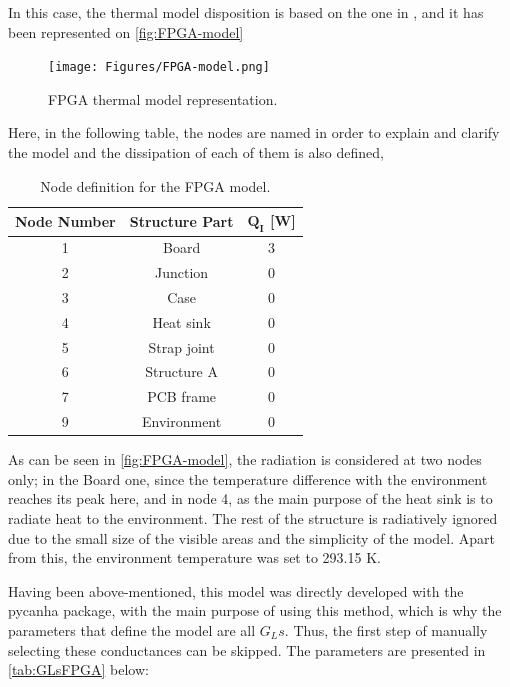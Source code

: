 In this case, the thermal model disposition is based on the one in \cite{amd2024}, and it has been represented on \autoref{fig:FPGA-model} 

\begin{figure}[H]
    \centering
    \texttt{[image: Figures/FPGA-model.png]}
    \caption{FPGA thermal model representation.}
    \label{fig:FPGA-model}
\end{figure}

Here, in the following table, the nodes are named in order to explain and clarify the model and the dissipation of each of them is also defined,

\begin{table}[H]
    \centering
    \caption{Node definition for the FPGA model.}
    \label{tab:nodesFPGA}
    \begin{tabular}{c c c}
    \toprule
    \multicolumn{1}{c}{\textbf{Node Number}} & \multicolumn{1}{c}{\textbf{Structure Part}} & \multicolumn{1}{c}{$\boldsymbol{Q_I}$ [W]} \\\midrule
    1 & Board  & 3 \\
    2 & Junction  & 0 \\
    3 & Case  & 0 \\
    4 & Heat sink  & 0 \\
    5 & Strap joint  & 0 \\
    6 & Structure A  & 0 \\
    7 & PCB frame  & 0 \\
    9 & Environment  & 0 \\\bottomrule
    \end{tabular}
    \end{table}

As can be seen in \autoref{fig:FPGA-model}, the radiation is considered at two nodes only; in the Board one, since the temperature difference with the environment reaches its peak here, and in node 4, as the main purpose of the heat sink is to radiate heat to the environment. The rest of the structure is radiatively ignored due to the small size of the visible areas and the simplicity of the model. Apart from this, the environment temperature was set to 293.15 K.

Having been above-mentioned, this model was directly developed with the pycanha package, with the main purpose of using this method, which is why the parameters that define the model are all $G_Ls$. Thus, the first step of manually selecting these conductances can be skipped. The parameters are presented in \autoref{tab:GLsFPGA} below:

